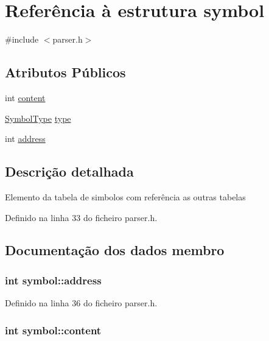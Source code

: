 \hypertarget{structsymbol}{\section{Referência à estrutura symbol}
\label{structsymbol}
}


{\ttfamily \#include $<$parser.\-h$>$}

\subsection*{Atributos Públicos}
\begin{DoxyCompactItemize}
\item 
int \hyperlink{structsymbol_a72c61f7152e8fadf84f1d13136ba741b}{content}
\item 
\hyperlink{parser_8h_add8909e1085c0c32f8380ff493a243b3}{Symbol\-Type} \hyperlink{structsymbol_adba0eaeb4bfbf4787bd3899e4202cc90}{type}
\item 
int \hyperlink{structsymbol_aa61e9dd64d1465422a2b39ca16dc3aca}{address}
\end{DoxyCompactItemize}


\subsection{Descrição detalhada}
Elemento da tabela de simbolos com referência as outras tabelas 

Definido na linha 33 do ficheiro parser.\-h.



\subsection{Documentação dos dados membro}
\hypertarget{structsymbol_aa61e9dd64d1465422a2b39ca16dc3aca}{
\subsubsection[{address}]{\setlength{\rightskip}{0pt plus 5cm}int symbol\-::address}}\label{structsymbol_aa61e9dd64d1465422a2b39ca16dc3aca}


Definido na linha 36 do ficheiro parser.\-h.

\hypertarget{structsymbol_a72c61f7152e8fadf84f1d13136ba741b}{
\subsubsection[{content}]{\setlength{\rightskip}{0pt plus 5cm}int symbol\-::content}}\label{structsymbol_a72c61f7152e8fadf84f1d13136ba741b}


